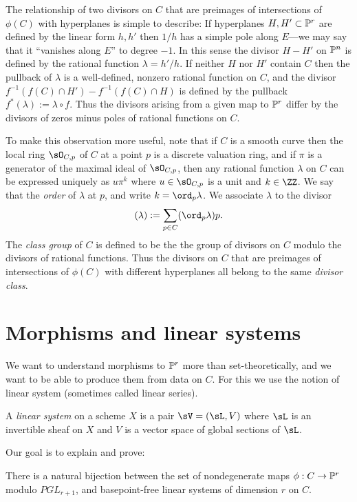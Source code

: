 The relationship of two divisors on $C$ that are preimages of intersections of $\phi(C)$ with hyperplanes is simple to describe: If hyperplanes
$H, H'\subset \PP^r$ are defined by the linear form $h, h'$  then $1/h$ has a simple pole along $E$---we may say that it ``vanishes along $E$'' to degree $-1$.
In this sense the divisor $H-H'$ on $\PP^n$ is defined by the rational function $\lambda= h'/h$. If neither $H$ nor $H'$ contain $C$ then the pullback of $\lambda$ is a well-defined, nonzero rational function on $C$, and the divisor 
$f^{-1}(f(C)\cap H') - f^{-1}(f(C)\cap H)$ is defined by the pullback  $f^*(\lambda) := \lambda \circ f$. Thus the divisors arising from a given map to $\PP^{r}$ differ by the divisors of zeros minus poles of rational functions on $C$. 

To make this observation more useful, note that if $C$ is a smooth curve then the local ring $\sO_{C,p}$ of $C$ at a point $p$ is a discrete valuation ring, and if $\pi$ is a generator of the maximal ideal of $\sO_{C,p}$, then any rational
function $\lambda$ on $C$ can be expressed uniquely as $u\pi^k$ where $u\in \sO_{C,p}$ is a unit and $k\in \ZZ$. We say that
the \emph{order} of $\lambda$ at $p$, and write $k = \ord_p \lambda$. We associate $\lambda$ to the divisor
$$
(\lambda) := \sum_{p\in C} (\ord_p\lambda)p.
$$
The \emph{class group} of $C$ is defined to be the the group of divisors on $C$ modulo the divisors of rational functions.
Thus the divisors on $C$ that are preimages of intersections of $\phi(C)$ with different hyperplanes all belong to the same
\emph{divisor class}.

\section{Morphisms and linear systems}
We want to understand morphisms to $\PP^r$ more than set-theoretically, and we want to be able to produce them from data on $C$. For this we use the notion of linear system (sometimes called linear series). 

\begin{definition}
 A \emph{linear system} on a scheme $X$ is a pair $\sV  = (\sL, V)$ where $\sL$ is an invertible sheaf on $X$ and
 $V$ is a vector space of global sections of $\sL$. 
\end{definition}

Our goal is to explain and prove:
\begin{theorem}\label{maps and linear systems}
There is a natural bijection between the set of nondegenerate maps $\phi : C \to \PP^r$ modulo $PGL_{r+1}$, and basepoint-free linear systems of dimension $r$ on $C$.
\end{theorem}

